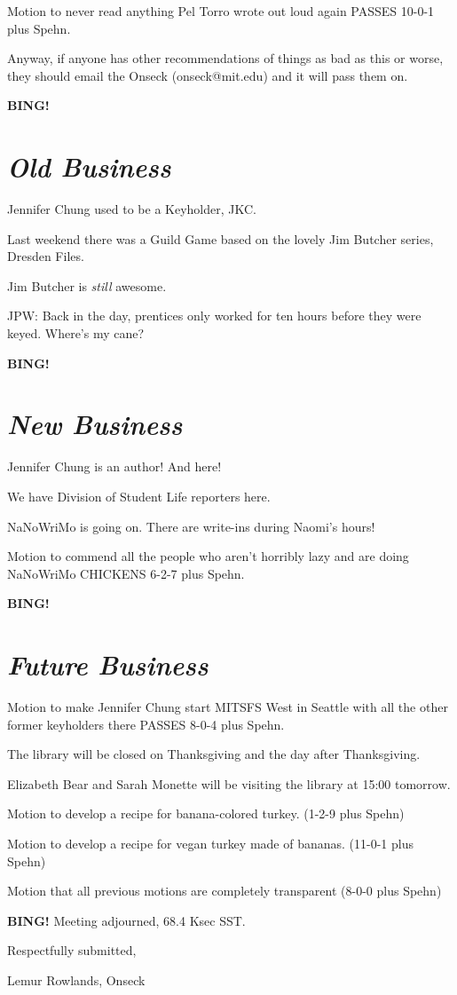 \documentclass[10pt]{article}
\newcommand{\bing}{{\bf BING!} }
\newcommand{\goto}[1]{\bing \vskip 12pt \section*{{\em{#1}}}}
\newcommand{\ps}{ plus Spehn\xspace}
\newcommand{\onseck}{Lemur Rowlands, Onseck}
\begin{document}
Motion to never read anything Pel Torro wrote out loud again PASSES
10-0-1\ps.

Anyway, if anyone has other recommendations of things as bad as this or worse,
they should email the Onseck (onseck@mit.edu) and it will pass them on.


\goto{Old Business}

Jennifer Chung used to be a Keyholder, JKC.

Last weekend there was a Guild Game based on the lovely
Jim Butcher series, Dresden Files.

Jim Butcher is \emph{still} awesome.

JPW: Back in the day, prentices only worked for ten hours
before they were keyed.  Where's my cane?

\goto{New Business}

Jennifer Chung is an author!  And here!

We have Division of Student Life reporters here.

NaNoWriMo is going on.  There are write-ins during Naomi's hours!

Motion to commend all the people who aren't horribly lazy and
are doing NaNoWriMo CHICKENS 6-2-7\ps.

\goto{Future Business}

Motion to make Jennifer Chung start MITSFS West in Seattle
with all the other former keyholders there PASSES 8-0-4\ps.

The library will be closed on Thanksgiving and the day after
Thanksgiving.

Elizabeth Bear and Sarah Monette will be visiting the library
at 15:00 tomorrow.

Motion to develop a recipe for banana-colored turkey.  (1-2-9\ps)

Motion to develop a recipe for vegan turkey made of bananas. (11-0-1\ps)

Motion that all previous motions are completely transparent (8-0-0\ps)

\bing
\noindent
Meeting adjourned, 68.4 Ksec SST.

\vspace{18pt}

\centerline{Respectfully submitted,}
\centerline{\onseck}
\end{document}
